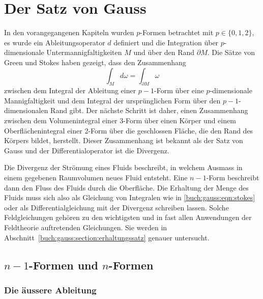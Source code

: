 %
%
%
\chapter{Der Satz von Gauss
\label{chapter:gauss}}
In den vorangegangenen Kapiteln wurden $p$-Formen betrachtet mit
$p\in\{0,1,2\}$, es wurde ein Ableitungsoperator $d$ definiert
und die Integration über $p$-dimensionale Untermannigfaltigkeiten $M$
und über den Rand $\partial M$.
Die Sätze von Green und Stokes haben gezeigt, dass den Zusammenhang
\begin{equation}
\int_M d\omega = \int_{\partial M} \omega
\label{buch:gauss:eqn:stokes}
\end{equation}
zwischen dem Integral der Ableitung einer $p-1$-Form über eine
$p$-dimensionale Mannigfaltigkeit und dem Integral der ursprünglichen
Form über den $p-1$-dimensionalen Rand gibt.
Der nächste Schritt ist daher, einen Zusammenhang zwischen dem Volumenintegral
einer 3-Form über einen Körper und einem Oberflächenintegral
einer 2-Form über die geschlossen Fläche, die den Rand des Körpers bildet,
herstellt.
Dieser Zusammenhang ist bekannt als der Satz von Gauss und der
Differentialoperator ist die Divergenz.

Die Divergenz der Strömung eines Fluids beschreibt, in welchem Ausmass
in einem gegebenen Raumvolumen neues Fluid entsteht.
Eine $n-1$-Form beschreibt dann den Fluss des Fluids durch die Oberfläche.
Die Erhaltung der Menge des Fluids muss sich also als Gleichung
von Integralen wie in \eqref{buch:gauss:eqn:stokes} oder als
Differentialgleichung mit der Divergenz schreiben lassen.
Solche Feldgleichungen gehören zu den wichtigsten und in fast allen
Anwendungen der Feldtheorie auftretenden Gleichungen.
Sie werden in Abschnitt~\ref{buch:gauss:section:erhaltungssatz}
genauer untersucht.

%
%
\section{$n-1$-Formen und $n$-Formen
\label{buch:gauss:section:1formenundnformen}}

\subsection{Die äussere Ableitung}

%
%
